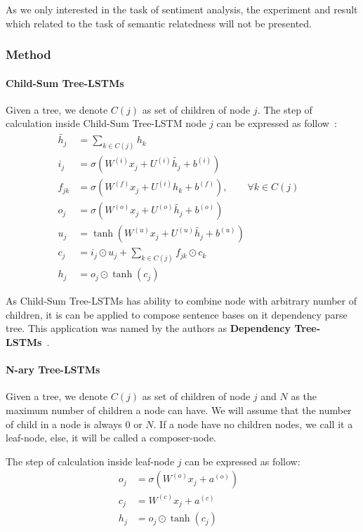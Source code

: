As we only interested in  the task of sentiment analysis, the experiment and result which related to the task of semantic relatedness will not be presented.

\subsubsection{Method}
\paragraph{Child-Sum Tree-LSTMs}
Given a tree, we denote \(C(j)\) as set of children of node \(j\).
The step of calculation inside Child-Sum Tree-LSTM node \(j\) can be expressed as follow~\cite{treeLSTM}:
\begin{align}
  	\tilde{h_j} &= \sum_{k \in C(j)} h_k &\label{eq1:2}\\
  	i_j &= \sigma{(W^{(i)}x_j + U^{(i)}\tilde{h_j} + b^{(i)})} &\label{eq1:3}\\
  	f_{jk} &= \sigma{(W^{(f)}x_j + U^{(i)}h_k + b^{(f)})}, \qquad  \forall k \in C(j) & \label{eq1:foget1}\\
  	o_j &= \sigma{(W^{(o)}x_j + U^{(o)}\tilde{h_j} + b^{(o)})} &\label{eq1:5}\\
  	u_j &= \tanh{(W^{(u)}x_j + U^{(u)}\tilde{h_j} + b^{(u)})} &\label{eq1:6}\\
   	c_j &= i_j \odot u_j + \sum_{k \in C(j)} f_{jk} \odot c_k & \\
	h_j &= o_j \odot \tanh{(c_j)} &
\end{align}

As Child-Sum Tree-LSTMs has ability to combine node with arbitrary number of children, it is can be applied to compose sentence bases on it dependency parse tree.
This application was named by the authors as \textbf{Dependency Tree-LSTMs}~\cite{treeLSTM}.

\paragraph{N-ary Tree-LSTMs}
Given a tree, we denote \(C(j)\) as set of children of node \(j\) and \(N\) as the maximum number of children a node can have. 
We will assume that the number of child in a node is always \(0\) or \(N\). 
If a node have no children nodes, we call it a leaf-node, else, it will be called a composer-node. 

The step of calculation inside leaf-node \(j\) can be expressed as follow:
\begin{align}
	o_j &= \sigma{\left( W^{(o)} x_j + a^{\left(o\right)}\right)} & \\
   	c_j &= W^{(c)} x_j + a^{(c)} & \\
	h_j &= o_j \odot \tanh{\left(c_j\right)} &
\end{align}

